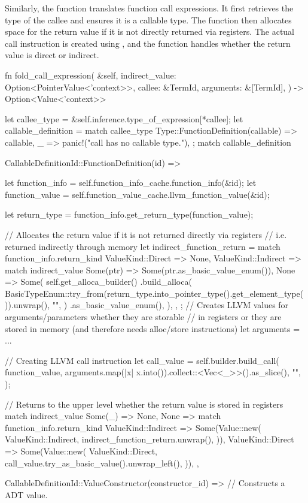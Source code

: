 \documentclass[
  oneside,
  english,
  coorientadorbanca,
  noabntexcite
]{ufsc-thesis-rn46-2019}
\newcommand{\code}[1]{\text{\scpfamily\setlength\spaceskip{0.35em}#1}}
\begin{document}
Similarly, the \code{fold\_call\_expression} function translates function call expressions.
It first retrieves the type of the callee and ensures it is a callable type.
The function then allocates space for the return value if it is not directly returned via registers.
The actual call instruction is created using \code{build\_call}, and the function handles whether the return value is direct or indirect.

\begin{rustcode}
fn fold_call_expression(
  &self,
  indirect_value: Option<PointerValue<'context>>,
  callee: &TermId,
  arguments: &[TermId],
) -> Option<Value<'context>> {
  let callee_type = &self.inference.type_of_expression[*callee];
  let callable_definition = match callee_type {
    Type::FunctionDefinition(callable) => callable,
    _ => panic!("call has no callable type."),
  };
  match callable_definition {
    CallableDefinitionId::FunctionDefinition(id) => {
      let function_info = self.function_info_cache.function_info(&id);
      let function_value = self.function_value_cache.llvm_function_value(&id);

      let return_type = function_info.get_return_type(function_value);

      // Allocates the return value if it is not returned directly via registers
      // i.e. returned indirectly through memory
      let indirect_function_return = match function_info.return_kind {
        ValueKind::Direct => None,
        ValueKind::Indirect => match indirect_value {
          Some(ptr) => Some(ptr.as_basic_value_enum()),
          None => Some(
            self.get_alloca_builder()
              .build_alloca(
                BasicTypeEnum::try_from(return_type.into_pointer_type().get_element_type()).unwrap(),
                "",
              )
              .as_basic_value_enum(),
          ),
        },
      }; 
      // Creates LLVM values for arguments/parameters whether they are storable
      // in registers or they are stored in memory (and therefore needs alloc/store instructions)
      let arguments = ...

      // Creating LLVM call instruction
      let call_value = self.builder.build_call(
          function_value,
          arguments.map(|x| x.into()).collect::<Vec<_>>().as_slice(),
          "",
      );

      // Returns to the upper level whether the return value is stored in registers
      match indirect_value {
          Some(_) => None,
          None => match function_info.return_kind {
              ValueKind::Indirect => Some(Value::new(
                  ValueKind::Indirect,
                  indirect_function_return.unwrap(),
              )),
              ValueKind::Direct => Some(Value::new(
                  ValueKind::Direct,
                  call_value.try_as_basic_value().unwrap_left(),
              )),
          },
      }
    }
    CallableDefinitionId::ValueConstructor(constructor_id) => {
      // Constructs a ADT value.
    }
  }
}
\end{rustcode}
\end{document}

